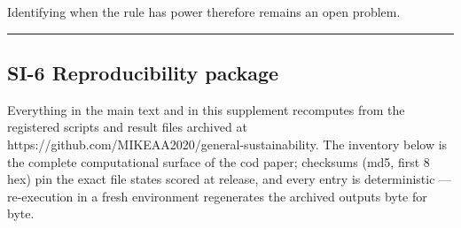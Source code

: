 \documentclass[11pt]{article}
\begin{document}
Identifying when the rule has power therefore remains an open problem.

\begin{center}\rule{0.5\linewidth}{0.5pt}\end{center}

\subsection{SI-6 Reproducibility
package}\label{si-6-reproducibility-package}

Everything in the main text and in this supplement recomputes from the
registered scripts and result files archived at
https://github.com/MIKEAA2020/general-sustainability. The inventory
below is the complete computational surface of the cod paper; checksums
(md5, first 8 hex) pin the exact file states scored at release, and
every entry is deterministic --- re-execution in a fresh environment
regenerates the archived outputs byte for byte.
\end{document}

